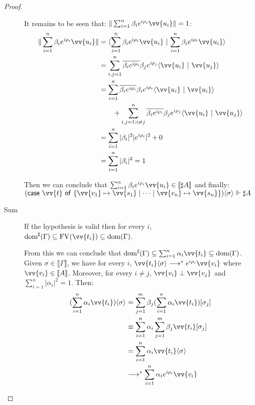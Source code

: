 \documentclass[runningheads,orivec,envcountsame,envcountsect]{llncs}
\newcommand\lra{\longrightarrow}
\newcommand\ansubst[2]{\ensuremath{\langle #1 \rangle_{#2}}}
\newcommand\dom[1]{\mathrm{dom}(#1)}
\newcommand\sdom[1]{\mathrm{dom}^{\sharp}(#1)}
\newcommand\FV[1]{\mathrm{FV}(#1)}
\def\scal#1#2{\langle{#1}~|~{#2}\rangle}
\def\gencase#1#2#3#4#5{\ensuremath{\mathsf{case}~#1~\mathsf{of}~\{#2\mapsto #4 \mid \dotsb \mid #3\mapsto #5\}}}
\def\eval{\lra^*}
\def\sem#1{\llbracket#1\rrbracket}
\def\real{\Vdash}
\begin{document}
\begin{proof}
\begin{description}
    It remains to be seen that: $\|\sum_{i=1}^{n}\beta_i e^{i\rho_i} \vv{u_i}\|=1$:
    \begin{align*}
        \|\sum_{i=1}^{n}\beta_i e^{i\rho_i} \vv{u_i}\| &= \scal{\sum_{i=1}^{n}\beta_i e^{i\rho_i} \vv{u_i}}{\sum_{i=1}^{n}\beta_i e^{i\rho_i} \vv{u_i}}\\
        &= \sum_{i,j=1}^{n}\overline{\beta_i e^{i\rho_i}}\beta_j e^{i\rho_j} \scal{\vv{u_i}}{\vv{u_j}}\\
        &= \sum_{i=1}^{n}\overline{\beta_i e^{i\rho_i}}\beta_i e^{i\rho_i} \scal{\vv{u_i}}{\vv{u_i}}\\
        &\qquad + \sum_{i,j=1; i\neq j}^{n}\overline{\beta_i e^{i\rho_i}}\beta_j e^{i\rho_j} \scal{\vv{u_i}}{\vv{u_j}}\\
        &= \sum_{i=1}^{n}|\beta_i|^2 |e^{i\rho_i}|^2  + 0\\
        &= \sum_{i=1}^{n}|\beta_i|^2 = 1
    \end{align*}

    Then we can conclude that $\sum_{i=1}^{n}\beta_i e^{i\rho_i}\vv{u_i}\in\sem{\sharp A}$ and finally: $(\gencase{\vv{t}}{\vv{v_1}}{\vv{v_n}}{\vv{s_1}}{\vv{s_n}})\ansubst{\sigma}{}\real\sharp A $
  
    \item[Sum] If the hypothesis is valid then for every $i$, $\sdom{\Gamma}\subseteq\FV{\vv{t_i}}\subseteq\dom{\Gamma}$.
    
    From this we can conclude that $\sdom{\Gamma}\subseteq\sum_{i=1}^{n}\alpha_i \vv{t_i}\subseteq\dom{\Gamma}$. Given $\sigma\in\sem{\Gamma}$, we have for every $i$, $\vv{t_i}\ansubst{\sigma}{}\eval e^{i\rho_i} \vv{v_i}$ where $\vv{v_i}\in\sem{A}$. Moreover, for every $i\neq j$, $\vv{v_i}\perp\vv{v_j}$ and $\sum_{i=1}^{n}|\alpha_i|^2=1$. Then:
    \begin{align*}
    (\sum_{i=1}^{n}\alpha_i\vv{t_i})\ansubst{\sigma}{} 
    &= \sum_{j=1}^{m}\beta_j(\sum_{i=1}^{n}\alpha_i \vv{t_i})[\sigma_j]\\
    &\equiv \sum_{i=1}^{n} \alpha_i \sum_{j=1}^{m} \beta_j \vv{t_i}[\sigma_j]\\
    &=\sum_{i=1}^{n} \alpha_i \vv{t_i}\ansubst{\sigma}{}\\
    &\eval \sum_{i=1}^{n} \alpha_i e^{i\rho_i} \vv{v_i}\\
    \end{align*}


\end{description}
\end{proof}
\end{document}
